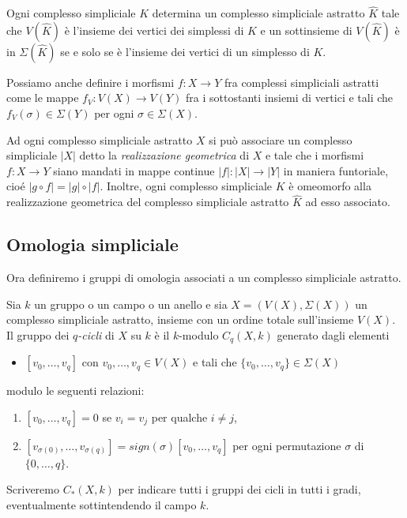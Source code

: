 \begin{rmk}
  Ogni complesso simpliciale $K$ determina un complesso simpliciale astratto $\widehat{K}$ tale che $V(\widehat{K})$ è l'insieme dei vertici dei simplessi di $K$ e un sottinsieme di $V(\widehat{K})$ è in $\Sigma(\widehat{K})$ se e solo se è l'insieme dei vertici di un simplesso di $K$.
\end{rmk}

Possiamo anche definire i morfismi $f:X\to Y$ fra complessi simpliciali astratti come le mappe $f_V:V(X)\to V(Y)$ fra i sottostanti insiemi di vertici e tali che $f_V(\sigma)\in \Sigma(Y)$ per ogni $\sigma \in \Sigma(X)$.


Ad ogni complesso simpliciale astratto $X$ si può associare un complesso simpliciale $|X|$ detto la \emph{realizzazione geometrica} di $X$  e tale che i morfismi $f:X\to Y$ siano mandati in mappe continue $|f|:|X|\to |Y|$ in maniera funtoriale, cioé $|g\circ f|=|g|\circ |f|$. Inoltre, ogni complesso simpliciale $K$ è omeomorfo alla realizzazione geometrica del complesso simpliciale astratto $\widehat{K}$ ad esso associato.

\subsection{Omologia simpliciale}

Ora definiremo i gruppi di omologia associati a un complesso simpliciale astratto.

\begin{definition}
  Sia $k$ un gruppo o un campo o un anello e
  sia $X=(V(X),\Sigma(X))$ un complesso simpliciale astratto, insieme con un ordine totale sull'insieme $V(X)$. Il gruppo dei \emph{$q$-cicli} di $X$ su $k$ è il $k$-modulo $C_q(X,k)$ generato dagli elementi
  \begin{itemize}
    \item $[v_0,\dots, v_q]$ con $v_0,\dots, v_q\in V(X)$ e tali che $\{v_0,\dots,v_q\}\in\Sigma(X)$
  \end{itemize}
  modulo le seguenti relazioni:
  \begin{enumerate}
    \item $[v_0,\dots,v_q]=0$ se $v_i = v_j$ per qualche $i\neq j$,
    \item $[v_{\sigma(0)},\dots,v_{\sigma(q)}]=sign(\sigma)[v_0,\dots,v_q]$ per ogni permutazione $\sigma$ di $\{0,\dots,q\}$.
  \end{enumerate}

  Scriveremo $C_*(X,k)$ per indicare tutti i gruppi dei cicli in tutti i gradi, eventualmente sottintendendo il campo $k$.
\end{definition}

